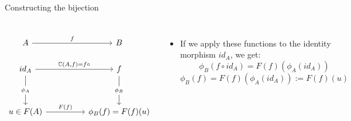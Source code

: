 \begin{frame}[fragile]{Constructing the bijection}
	\begin{columns}
		\[\begin{tikzcd}
			A && B \\
			{id_A} && {f} \\
			\\
			{u \in F(A)} && {\phi_B(f) = F(f)(u)}
			\arrow["f", from=1-1, to=1-3]
			\arrow["{\bC(A,f) = f \circ}", from=2-1, to=2-3]
			\arrow["{\phi_A}"{description}, from=2-1, to=4-1]
			\arrow["{\phi_B}"{description}, from=2-3, to=4-3]
			\arrow["{F(f)}", from=4-1, to=4-3]
		\end{tikzcd}\]
		
		\begin{itemize}
			\item If we apply these functions to the identity morphism $id_A$, we get:
			\[\phi_B(f \circ id_A) = F(f)(\phi_A(id_A))\]
			\[\phi_B(f) = F(f)(\phi_A(id_A)) := F(f)(u)\]
		\end{itemize}
	\end{columns}
\end{frame}